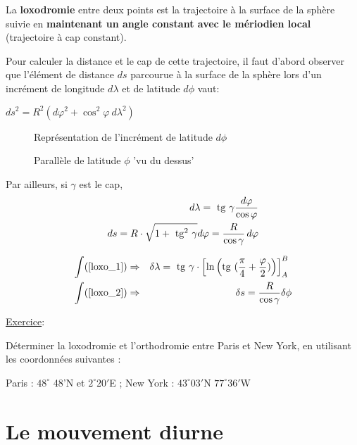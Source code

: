 \documentclass[12pt]{report}
\def\tan{\mathrm{tg}}
\begin{document}
La \textbf{loxodromie} entre deux points est la trajectoire à la surface de la sphère suivie en \textbf{maintenant un angle constant avec le mériodien local} (trajectoire à cap constant). 

Pour calculer la distance et le cap de cette trajectoire, il faut d'abord observer que l'élément de distance $ds$ parcourue à la surface de la sphère lors d'un incrément de longitude $d\lambda$ et de latitude $d\phi$ vaut:

$ds^2=R^2(d\varphi^2+\cos^2\varphi \ d\lambda^2)$

\begin{figure}[ht]
\begin{center}
\end{center}
\caption{Représentation de l'incrément de latitude $d\phi$}
\label{fig:12}
\end{figure}

\begin{figure}[ht]
\begin{center}
\end{center}
\caption{Parallèle de latitude $\phi$ 'vu du dessus'}
\label{fig:13}
\end{figure}


Par ailleurs, si $\gamma$ est le cap,
\begin{eqnarray}
d\lambda = \ \tan \  \gamma {d\varphi\over \cos \varphi} \label{loxo_1} \\
ds = R \cdot \sqrt {1+\ \tan^2 \  \gamma} d\varphi  = \frac{R}{\cos\gamma}\,d\varphi \label{loxo_2}
\end{eqnarray}

\begin{eqnarray}
\int (\ref{loxo_1}) &\Rightarrow& \delta \lambda = \ \tan \ \gamma \cdot \left[\ln\left (\tan \ ({\pi\over 4} + \frac{\varphi}{2})\right)\right]^B_A \ \\
\int (\ref{loxo_2}) &\Rightarrow& \delta s = \frac{R}{\cos\gamma}\delta\phi
\end{eqnarray}


\underline{Exercice}: 

Déterminer la loxodromie et l'orthodromie entre Paris et New York, en utilisant les coordonnées suivantes :

Paris : $48^\circ$ 48'N  et $2^\circ20'$E  ; New York : $43^\circ03'$N $77^\circ36'$W


\bigskip

\par\noindent
\chapter{Le mouvement diurne}
\end{document}
